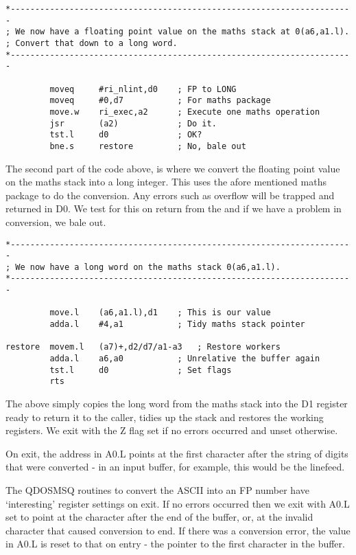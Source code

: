 \begin{lstlisting}[firstnumber=last,caption={ASCII to LONG Converter - Part 2}]
*----------------------------------------------------------------------
; We now have a floating point value on the maths stack at 0(a6,a1.l).
; Convert that down to a long word.
*----------------------------------------------------------------------

         moveq     #ri_nlint,d0    ; FP to LONG
         moveq     #0,d7           ; For maths package
         move.w    ri_exec,a2      ; Execute one maths operation
         jsr       (a2)            ; Do it.
         tst.l     d0              ; OK?
         bne.s     restore         ; No, bale out
\end{lstlisting}

The second part of the code above, is where we convert the floating point value
on the maths stack into a long integer. This uses the afore mentioned maths
package to do the conversion. Any errors such as overflow will be trapped and
returned in D0. We test for this on return from the  and if we have a
problem in conversion, we bale out.

\begin{lstlisting}[firstnumber=last,caption={ASCII to LONG Converter - Part 3}]
*----------------------------------------------------------------------
; We now have a long word on the maths stack 0(a6,a1.l).
*----------------------------------------------------------------------

         move.l    (a6,a1.l),d1    ; This is our value
         adda.l    #4,a1           ; Tidy maths stack pointer

restore  movem.l   (a7)+,d2/d7/a1-a3   ; Restore workers
         adda.l    a6,a0           ; Unrelative the buffer again
         tst.l     d0              ; Set flags
         rts
\end{lstlisting}

The above simply copies the long word from the maths stack into the D1 register
ready to return it to the caller, tidies up the stack and restores the working
registers. We exit with the Z flag set if no errors occurred and unset otherwise.

On exit, the address in A0.L points at the first character after the string of
digits that were converted -{} in an input buffer, for example, this would be the
linefeed.

The QDOSMSQ routines to convert the ASCII into an FP number have `interesting'
register settings on exit. If no errors occurred then we exit with A0.L set to
point at the character after the end of the buffer, or, at the invalid
character that caused conversion to end. If there was a conversion error, the
value in A0.L is reset to that on entry -{} the pointer to the first character in
the buffer.

